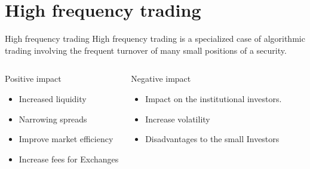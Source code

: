 \documentclass[xcolor={x11names,svgnames,dvipsnames}]{beamer}
\begin{document}
\section{High frequency trading}
\begin{frame}


\begin{block}{High frequency trading}
High frequency trading is a specialized case of algorithmic trading involving the frequent turnover of many small positions of a security.
\end{block}

\begin{columns}
\column{2.3in}
\begin{block}{Positive impact }
\begin{itemize}
\item Increased liquidity
\item Narrowing spreads
\item Improve market efficiency
\item Increase fees for Exchanges  
\end{itemize}
\end{block}

\column{2.3in}
\begin{block}{Negative impact }
\begin{itemize}
\item Impact on the institutional investors.
\item Increase volatility 
\item Disadvantages to the small Investors
\end{itemize}
\end{block}
\end{columns}

\end{frame}
\end{document}
